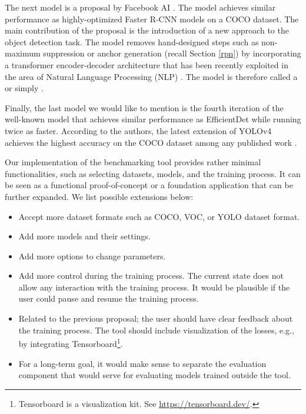 The next model is a proposal by Facebook AI \cite{detr}. The model achieves similar
performance as highly-optimized Faster R-CNN models on a COCO dataset. The main
contribution of the proposal is the introduction of a new approach to the object
detection task. The model removes hand-designed steps such as non-maximum
suppression or anchor generation (recall Section \ref{rpn}) by incorporating a
transformer encoder-decoder architecture \cite{transformer} that has been
recently exploited in the area of Natural Language Processing (NLP)
\cite{bert, gpt3}. The model is therefore called a  or
simply .

Finally, the last model we would like to mention is the fourth iteration of the
well-known  model \cite{yolo1, yolo2, yolo3, yolo4} that achieves similar
performance as EfficientDet while running twice as faster. According to the
authors, the latest extension of YOLOv4 achieves the highest accuracy on the
COCO dataset among any published work \cite{yolo4scaled}.

Our implementation of the benchmarking tool provides rather minimal
functionalities, such as selecting datasets, models, and the training process.
It can be seen as a functional proof-of-concept or a foundation application that
can be further expanded. We list possible extensions below:
\begin{itemize}
      \item Accept more dataset formats such as COCO, VOC, or YOLO dataset format.
      \item Add more models and their settings.
      \item Add more options to change parameters.
      \item Add more control during the training process. The current state does
            not allow any interaction with the training process. It would be
            plausible if the user could pause and resume the training process.
      \item Related to the previous proposal; the user should have clear feedback
            about the training process. The tool should include visualization of
            the losses, e.g., by integrating Tensorboard\footnote{
                  Tensorboard is a visualization kit. See
                  \url{https://tensorboard.dev/}.
            }.
      \item For a long-term goal, it would make sense to separate the evaluation
            component that would serve for evaluating models trained outside the
            tool.
\end{itemize}